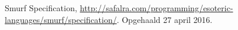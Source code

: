 \begin{thebibliography}{9}
	 Smurf Specification,
	\url{http://safalra.com/programming/esoteric-languages/smurf/specification/}.
	Opgehaald 27 april 2016.
\end{thebibliography}

